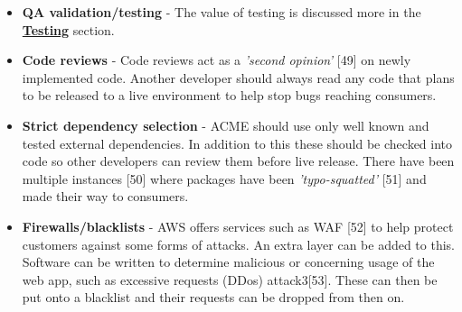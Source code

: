 \begin{itemize}
    \item \textbf{QA validation/testing} - The value of testing is discussed more in the \hyperref[sec:Testing]{\textbf{Testing}} section.
    
    \item \textbf{Code reviews} - Code reviews act as a \textit{'second opinion'} [49] on newly implemented code. Another developer should always read any 
    code that plans to be released to a live environment to help stop bugs reaching consumers.

    \item \textbf{Strict dependency selection} - ACME should use only well known and tested external dependencies. In addition to this these should be checked
    into code so other developers can review them before live release. There have been multiple instances [50] where packages have been 
    \textit{'typo-squatted'} [51] and made their way to consumers.
    
    \item \textbf{Firewalls/blacklists} - AWS offers services such as WAF [52] to help protect customers against some forms of attacks. An extra layer can be 
    added to this. Software can be written to determine malicious or concerning usage of the web app, such as excessive requests (DDos) attack3[53]. 
    These can then be put onto a blacklist and their requests can be dropped from then on.
  \end{itemize}

\newpage
